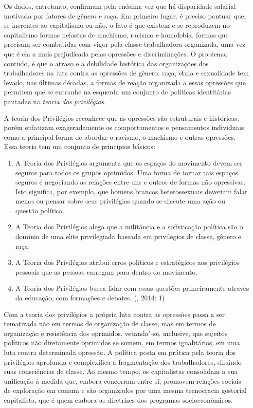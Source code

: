 Os dados, entretanto, confirmam pela enésima vez que há disparidade
salarial motivada por fatores de gênero e raça. Em primeiro lugar, é
preciso pontuar que, se inerentes ao capitalismo ou não, o fato é que
existem e se reproduzem no capitalismo formas nefastas de machismo,
racismo e homofobia, formas que precisam ser combatidas com vigor pela
classe trabalhadora organizada, uma vez que é ela a mais prejudicada
pelas opressões e discriminações. O problema, contudo, é que o atraso e
a debilidade histórica das organizações dos trabalhadores na luta contra
as opressões de gênero, raça, etnia e sexualidade tem levado, nas
últimas décadas, a formas de reação organizada a essas opressões que
permitem que se entranhe na esquerda um conjunto de políticas
identitárias pautadas na \emph{teoria dos privilégios}.

A teoria dos Privilégios reconhece que as opressões são estruturais e
históricas, porém enfatizam exageradamente os comportamentos e
pensamentos individuais como a principal forma de abordar o racismo, o
machismo e outras opressões. Essa teoria tem um conjunto de princípios
básicos:

\begin{enumerate}
\def\labelenumi{\alph{enumi}.}

\item A Teoria dos Privilégios argumenta que os espaços do
movimento devem ser seguros para todos os grupos oprimidos. Uma forma de
tornar tais espaços seguros é negociando as relações entre uns e outros
de formas não opressivas. Isto significa, por exemplo, que homens
brancos heterossexuais deveriam falar menos ou pensar sobre seus
privilégios quando se discute uma ação ou questão política.

\item A Teoria dos Privilégios alega que a militância e a
sofisticação política são o domínio de uma elite privilegiada baseada em
privilégios de classe, gênero e raça.

\item A Teoria dos Privilégios atribui erros políticos e
estratégicos aos privilégios pessoais que as pessoas carregam para
dentro do movimento.

\item A Teoria dos Privilégios busca lidar com essas questões
primeiramente através da educação, com formações e debates. (, 2014:
1)
\end{enumerate}

Com a teoria dos privilégios a própria luta contra as opressões passa a
ser tematizada não em termos de organização de classe, mas em termos de
organização e resistência dos oprimidos, vetando"-se, inclusive, que
sujeitos políticos não diretamente oprimidos se somem, em termos
igualitários, em uma luta contra determinada opressão. A política posta
em prática pela teoria dos privilégios aprofunda e complexifica a
fragmentação dos trabalhadores, diluindo suas consciências de classe. Ao
mesmo tempo, os capitalistas consolidam a sua unificação à medida que,
embora concorram entre si, promovem relações sociais de exploração em
comum e são organizados por uma mesma tecnocracia gestorial capitalista,
que é quem elabora as diretrizes dos programas socioeconômicos.

